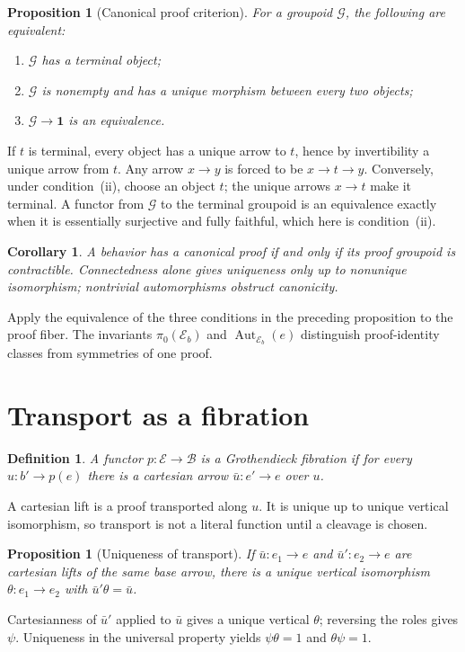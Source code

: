 \documentclass[12pt,a4paper,twoside]{extarticle}
\makeatletter
\theoremstyle{compactplain}
\newtheorem{proposition}[theorem]{Proposition}
\newtheorem{corollary}[theorem]{Corollary}
\theoremstyle{compactdef}
\newtheorem{definition}[theorem]{Definition}
\renewenvironment{proof}[1][\proofname]{\par\pushQED{\qed}\normalfont
  \topsep2pt\trivlist\item[\hskip\labelsep\bfseries #1\@addpunct{.}]\ignorespaces}
 {\popQED\endtrivlist\@endpefalse}
\newcommand{\Aut}{\operatorname{Aut}}
\makeatother
\begin{document}
\begin{proposition}[Canonical proof criterion]
For a groupoid $\mathcal G$, the following are equivalent:
\begin{enumerate}[label=(\roman*)]
\item $\mathcal G$ has a terminal object;
\item $\mathcal G$ is nonempty and has a unique morphism between every two objects;
\item $\mathcal G\to\mathbf 1$ is an equivalence.
\end{enumerate}
\end{proposition}
\begin{proof}
If $t$ is terminal, every object has a unique arrow to $t$, hence by invertibility a unique arrow from $t$. Any arrow $x\to y$ is forced to be $x\to t\to y$.  Conversely, under condition~(ii), choose an object $t$; the unique arrows $x\to t$ make it terminal.  A functor from $\mathcal G$ to the terminal groupoid is an equivalence exactly when it is essentially surjective and fully faithful, which here is condition~(ii).
\end{proof}

\begin{corollary}
A behavior has a canonical proof if and only if its proof groupoid is contractible. Connectedness alone gives uniqueness only up to nonunique isomorphism; nontrivial automorphisms obstruct canonicity.
\end{corollary}
\begin{proof}
Apply the equivalence of the three conditions in the preceding proposition to the proof fiber.
\end{proof}
The invariants $\pi_0(\mathcal E_b)$ and $\Aut_{\mathcal E_b}(e)$ distinguish proof-identity classes from symmetries of one proof.
\section{Transport as a fibration}

\begin{definition}
A functor $p:\mathcal E\to\mathcal B$ is a Grothendieck fibration if for every $u:b'\to p(e)$ there is a cartesian arrow $\bar u:e'\to e$ over $u$.
\end{definition}
A cartesian lift is a proof transported along $u$. It is unique up to unique vertical isomorphism, so transport is not a literal function until a cleavage is chosen.

\begin{proposition}[Uniqueness of transport]
If $\bar u:e_1\to e$ and $\bar u':e_2\to e$ are cartesian lifts of the same base arrow, there is a unique vertical isomorphism $\theta:e_1\to e_2$ with $\bar u'\theta=\bar u$.
\end{proposition}
\begin{proof}
Cartesianness of $\bar u'$ applied to $\bar u$ gives a unique vertical $\theta$; reversing the roles gives $\psi$. Uniqueness in the universal property yields $\psi\theta=1$ and $\theta\psi=1$.
\end{proof}
\end{document}
